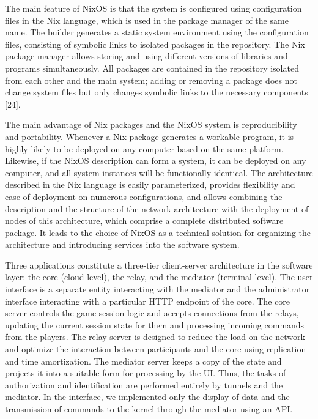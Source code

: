 \documentclass[
]{ceurart}
\begin{document}
The main feature of NixOS is that the system is configured using configuration files in the Nix language, which is used in the package manager of the same name. The builder generates a static system environment using the configuration files, consisting of symbolic links to isolated packages in the repository. The Nix package manager allows storing and using different versions of libraries and programs simultaneously. All packages are contained in the repository isolated from each other and the main system; adding or removing a package does not change system files but only changes symbolic links to the necessary components [24].

The main advantage of Nix packages and the NixOS system is reproducibility and portability. Whenever a Nix package generates a workable program, it is highly likely to be deployed on any computer based on the same platform. Likewise, if the NixOS description can form a system, it can be deployed on any computer, and all system instances will be functionally identical. The architecture described in the Nix language is easily parameterized, provides flexibility and ease of deployment on numerous configurations, and allows combining the description and the structure of the network architecture with the deployment of nodes of this architecture, which comprise a complete distributed software package. It leads to the choice of NixOS as a technical solution for organizing the architecture and introducing services into the software system.

Three applications constitute a three-tier client-server architecture in the software layer: the core (cloud level), the relay, and the mediator (terminal level). The user interface is a separate entity interacting with the mediator and the administrator interface interacting with a particular HTTP endpoint of the core. The core server controls the game session logic and accepts connections from the relays, updating the current session state for them and processing incoming commands from the players. The relay server is designed to reduce the load on the network and optimize the interaction between participants and the core using replication and time amortization. The mediator server keeps a copy of the state and projects it into a suitable form for processing by the UI. Thus, the tasks of authorization and identification are performed entirely by tunnels and the mediator. In the interface, we implemented only the display of data and the transmission of commands to the kernel through the mediator using an API.
\end{document}
